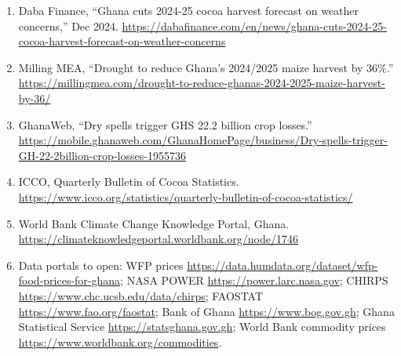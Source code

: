 \documentclass[11pt,letterpaper]{article}
\begin{document}
\begin{enumerate}[itemsep=0pt,topsep=2pt,leftmargin=1.4em]
\item Daba Finance, ``Ghana cuts 2024-25 cocoa harvest forecast on weather concerns,'' Dec 2024. \url{https://dabafinance.com/en/news/ghana-cuts-2024-25-cocoa-harvest-forecast-on-weather-concerns}
\item Milling MEA, ``Drought to reduce Ghana's 2024/2025 maize harvest by 36\%.'' \url{https://millingmea.com/drought-to-reduce-ghanas-2024-2025-maize-harvest-by-36/}
\item GhanaWeb, ``Dry spells trigger GHS 22.2 billion crop losses.'' \url{https://mobile.ghanaweb.com/GhanaHomePage/business/Dry-spells-trigger-GH-22-2billion-crop-losses-1955736}
\item ICCO, Quarterly Bulletin of Cocoa Statistics. \url{https://www.icco.org/statistics/quarterly-bulletin-of-cocoa-statistics/}
\item World Bank Climate Change Knowledge Portal, Ghana. \url{https://climateknowledgeportal.worldbank.org/node/1746}
\item Data portals to open: WFP prices \url{https://data.humdata.org/dataset/wfp-food-prices-for-ghana}; NASA POWER \url{https://power.larc.nasa.gov}; CHIRPS \url{https://www.chc.ucsb.edu/data/chirps}; FAOSTAT \url{https://www.fao.org/faostat}; Bank of Ghana \url{https://www.bog.gov.gh}; Ghana Statistical Service \url{https://statsghana.gov.gh}; World Bank commodity prices \url{https://www.worldbank.org/commodities}.
\end{enumerate}
\end{document}
